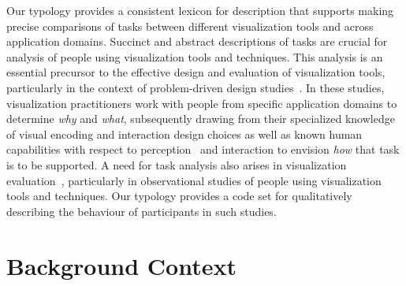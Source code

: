 Our typology provides a consistent lexicon for description that supports making precise comparisons of tasks between different visualization tools and across application domains.
Succinct and abstract descriptions of tasks are crucial for analysis of people using visualization tools and techniques.
This analysis is an essential precursor to the effective design and evaluation of visualization tools, particularly in the context of problem-driven design studies~\cite{Sedlmair2012}.
In these studies, visualization practitioners work with people from specific application domains to determine {\it why} and {\it what}, subsequently drawing from their specialized knowledge of visual encoding and interaction design choices as well as known human capabilities with respect to perception~\cite{Cleveland1984,Rensink2014} and interaction to envision {\it how} that task is to be supported.
A need for task analysis also arises in visualization evaluation~\cite{Lam2012}, particularly in observational studies of people using visualization tools and techniques.
Our typology provides a code set for qualitatively describing the behaviour of participants in such studies.



\section{Background Context}
\label{typology:context}


